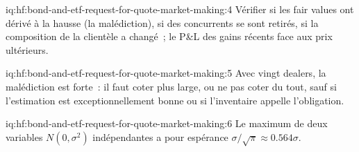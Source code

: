 \begin{solution}{iq:hf:bond-and-etf-request-for-quote-market-making:4}
Vérifier si les fair values ont dérivé à la hausse (la malédiction), si des concurrents se sont retirés, si la composition de la clientèle a changé~; le P\&L des gains récents face aux
prix ultérieurs.
\end{solution}

\begin{solution}{iq:hf:bond-and-etf-request-for-quote-market-making:5}
Avec vingt dealers, la malédiction est forte~: il faut coter plus large, ou ne pas coter du tout, sauf si l'estimation est exceptionnellement bonne ou si l'inventaire appelle l'obligation.
\end{solution}

\begin{solution}{iq:hf:bond-and-etf-request-for-quote-market-making:6}
Le maximum de deux variables $N(0,\sigma^2)$ indépendantes a pour espérance $\sigma/\sqrt\pi\approx0.564\sigma$.
\end{solution}
